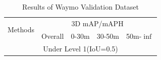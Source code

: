 \documentclass[journal]{IEEEtran}
\begin{document}
	
	\begin{table}[h]
		\centering
		\setlength{\tabcolsep}{1mm}
		\caption{Results of Waymo Validation Dataset}
		\label{tab:waymo_valid}
		
		{%
			\begin{tabular}{ccccc}
				\toprule%
				\multirow{2}{*}{Methods} & \multicolumn{4}{c}{3D mAP/mAPH}       \\ \cmidrule{2-5}
				& Overall & 0-30m & 30-50m & 50m-$\inf$ \\
				\midrule%
				
				\multicolumn{5}{c}{Under Level 1(IoU=0.5)}                       \\
				\midrule%
				

\end{tabular}}
\end{table}
\end{document}
